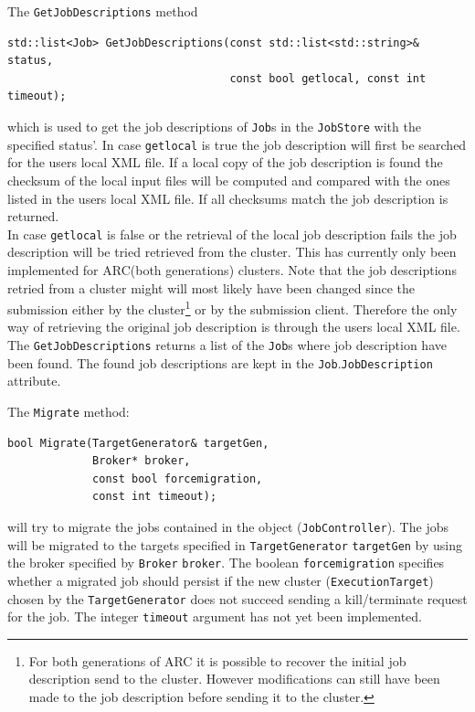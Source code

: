 \documentclass{book}
\newcommand{\Broker}{\texttt{Broker}}
\newcommand{\ExecutionTarget}{\texttt{ExecutionTarget}}
\newcommand{\Job}{\texttt{Job}}
\newcommand{\JobController}{\texttt{JobController}}
\newcommand{\TargetGenerator}{\texttt{TargetGenerator}}
\begin{document}
The \texttt{GetJobDescriptions} method 
\begin{shaded}
\begin{verbatim}
std::list<Job> GetJobDescriptions(const std::list<std::string>& status, 
                                  const bool getlocal, const int timeout);
\end{verbatim}
\end{shaded}
which is used to get the job descriptions of {\Job}s in the \texttt{JobStore} 
with the specified status'. In case \texttt{getlocal} is true the job description 
will first be searched for the users local XML file. If a local copy of 
the job description is found the checksum of the local input files will be 
computed and compared with the ones listed in the users local XML file. If 
all checksums match the job description is returned.\\
In case \texttt{getlocal} is false or the retrieval of the local job description 
fails the job description will be tried retrieved from the cluster. This has 
currently only been implemented for ARC(both generations) clusters. Note 
that the job descriptions retried from a cluster might will most likely have 
been changed since the submission either by the cluster\footnote{For both 
generations of ARC it is possible to recover the initial job description send 
to the cluster. However modifications can still have been made to the 
job description before sending it to the cluster.} or by the submission 
client. Therefore the only way of retrieving the original job description is 
through the users local XML file.\\
The \texttt{GetJobDescriptions} returns a list of the  {\Job}s where job description 
have been found. The found job descriptions are kept in the 
{\Job}.\texttt{JobDescription} attribute.

The \texttt{Migrate} method:
\begin{shaded}
\begin{verbatim}
bool Migrate(TargetGenerator& targetGen,
             Broker* broker,
             const bool forcemigration,
             const int timeout);
\end{verbatim}
\end{shaded}
will try to migrate the jobs contained in the object ({\JobController}). The jobs
will be migrated to the targets specified in {\TargetGenerator} \texttt{targetGen}
by using the broker specified by {\Broker} \texttt{broker}. The boolean
\texttt{forcemigration} specifies whether a migrated job should persist if the
new cluster ({\ExecutionTarget}) chosen by the {\TargetGenerator} does not
succeed sending a kill/terminate request for the job. The integer
\texttt{timeout} argument has not yet been implemented.
\end{document}
